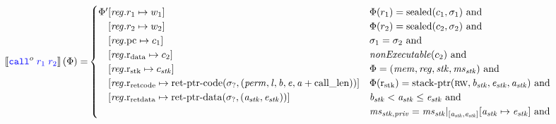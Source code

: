 \documentclass[a3paper]{article}
\newcommand{\sem}[1]{\left\llbracket #1 \right\rrbracket}
\newcommand{\tand}{\text{ and }}
\newcommand{\sourcecolor}{\color{blue}}
\newcommand{\src}[1]{{\sourcecolor #1}}
\newcommand{\zinstr}[1]{\texttt{#1}}
\newcommand{\scall}[4][]{  
\ifthenelse{\equal{#3#4}{}}
  {\ensuremath{\zinstr{\src{call}}_{#1}^{#2}}}
  {\ensuremath{\zinstr{\src{call}}_{#1}^{#2} \; #3 \; #4}}
}
\newcommand{\update}[2]{[#1 \mapsto #2]}
\newcommand{\updReg}[2]{\update{\reg.#1}{#2}}
\newcommand{\shareddom}[1]{\mathrm{#1}}
\newcommand{\perm}{\var{perm}}
\newcommand{\lin}{\var{l}}
\newcommand{\stkptr}[1]{\mathrm{stack\text{-}ptr}(#1)}
\newcommand{\retptrd}{\mathrm{ret\text{-}ptr\text{-}data}}
\newcommand{\retptrc}{\mathrm{ret\text{-}ptr\text{-}code}}
\newcommand{\sealed}[1]{\shareddom{sealed}(#1)}
\newcommand{\var}[1]{\mathit{#1}}
\newcommand{\reg}{\var{reg}}
\newcommand{\mem}{\var{mem}}
\newcommand{\ms}{\var{ms}}
\newcommand{\stk}{\var{stk}}
\newcommand{\priv}{\var{priv}}
\newcommand{\baddr}{\var{b}}
\newcommand{\eaddr}{\var{e}}
\newcommand{\aaddr}{\var{a}}
\newcommand{\constant}[1]{\mathrm{#1}}
\newcommand{\calllen}{\constant{call\_len}}
\newcommand{\pcreg}{\mathrm{pc}}
\newcommand{\rstk}{\mathrm{r}_\mathrm{stk}}
\newcommand{\rretc}{\mathrm{r}_\mathrm{ret code}}
\newcommand{\rretd}{\mathrm{r}_\mathrm{ret data}}
\newcommand{\rdata}{\mathrm{r}_\mathrm{data}}
\newcommand{\plainperm}[1]{\textsc{#1}}
\newcommand{\rw}{\plainperm{rw}}
\newcommand{\plainfun}[2]{
  \ifthenelse{\equal{#2}{}}
  {\mathit{#1}}
  {\mathit{#1}(#2)}
}
\newcommand{\nonExec}[1]{\plainfun{nonExecutable}{#1}}
\begin{document}
\begin{align*}
  \sem{\scall{o}{\src{r_1}}{\src{r_2}}}(\Phi) = & 
                                               \begin{cases}
                                                 \Phi'
                                                 \arraycolsep=0pt
                                                 \begin{array}[t]{rl}
                                                   &\updReg{r_1}{w_1} \\
                                                        &\updReg{r_2}{w_2} \\
                                                        &\updReg{\pcreg}{c_1}\\
                                                        &\updReg{\rdata}{c_2}\\
                                                        &\updReg{\rstk}{c_\stk}\\
                                                        &\updReg{\rretc}{\retptrc(\sigma_?,(\perm,\lin,\baddr,\eaddr,\aaddr+\calllen))}\\
                                                        &\updReg{\rretd}{\retptrd(\sigma_?,(\aaddr_\stk,\eaddr_\stk))}
                                                 \end{array}
                                                 & 
                                                 \arraycolsep=0pt
                                                 \begin{array}[t]{l}
                                                   \Phi(r_1) = \sealed{c_1,\sigma_1} \tand \\
                                                   \Phi(r_2) = \sealed{c_2,\sigma_2} \tand \\
                                                   \sigma_1 = \sigma_2 \tand \\
                                                   \nonExec{c_2} \tand\\
                                                   \Phi = (\mem,\reg,\stk,\ms_\stk) \tand\\
                                                   \Phi(\rstk) = \stkptr{\rw,\baddr_\stk,\eaddr_\stk,\aaddr_\stk} \tand \\
                                                   \baddr_\stk < \aaddr_\stk \leq \eaddr_\stk \tand \\
                                                   \ms_{\stk,\priv} = \ms_\stk |_{[\aaddr_\stk,\eaddr_\stk]}\update{\aaddr_\stk}{\eaddr_\stk} \tand\\

\end{array}
\end{cases}
\end{align*}
\end{document}
